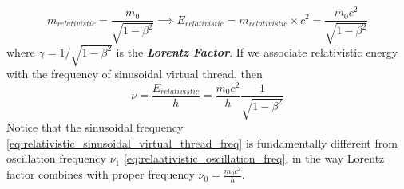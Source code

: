 \documentclass[11pt, a4paper]{article}
\begin{document}
\begin{equation}\label{eq:relativistic_mass_and_energy}
	m_{relativistic} = \frac{m_{0}}{\sqrt{1 - \beta^{2}}} \implies E_{relativistic} = m_{relativistic} \times c^{2} = \frac{m_{0}c^{2}}{\sqrt{1 - \beta^{2}}}
\end{equation}
where $\gamma = 1/\sqrt{1 - \beta^{2}}$ is the \textbf{\textit{Lorentz Factor}}. %
If we associate relativistic energy with the frequency of sinusoidal virtual thread, then
\begin{equation}\label{eq:relativistic_sinusoidal_virtual_thread_freq}
	\nu = \frac{E_{relativistic}}{h} = \frac{m_{0}c^{2}}{h} \frac{1}{\sqrt{1 - \beta^{2}}}
\end{equation}
Notice that the sinusoidal frequency \eqref{eq:relativistic_sinusoidal_virtual_thread_freq} is fundamentally different from oscillation frequency $\nu_{1}$ \eqref{eq:relaativistic_oscillation_freq}, in the way Lorentz factor combines with proper frequency $\nu_{0}=\frac{m_{0}c^{2}}{h}$.
\end{document}
